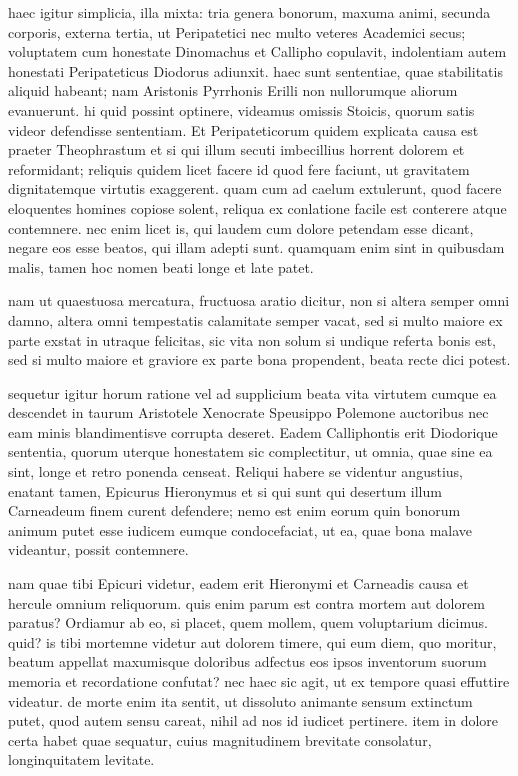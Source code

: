  haec igitur simplicia, illa mixta: tria genera bonorum, maxuma animi, secunda corporis, externa tertia, ut Peripatetici nec multo veteres Academici secus; voluptatem cum honestate Dinomachus et Callipho copulavit, indolentiam autem honestati Peripateticus Diodorus adiunxit. haec sunt sententiae, quae stabilitatis aliquid habeant; nam Aristonis Pyrrhonis Erilli non nullorumque aliorum evanuerunt. hi quid possint optinere, videamus omissis Stoicis, quorum satis videor defendisse sententiam. Et Peripateticorum quidem explicata causa est praeter Theophrastum et si qui illum secuti imbecillius horrent dolorem et reformidant; reliquis quidem licet facere id quod fere faciunt, ut gravitatem dignitatemque virtutis exaggerent. quam cum ad caelum extulerunt, quod facere eloquentes homines copiose solent, reliqua ex conlatione facile est conterere atque contemnere. nec enim licet is, qui laudem cum dolore petendam esse dicant, negare eos esse beatos, qui illam adepti sunt. quamquam enim sint in quibusdam malis, tamen hoc nomen beati longe et late patet.

 nam ut quaestuosa mercatura, fructuosa aratio dicitur, non si altera semper omni damno, altera omni tempestatis calamitate semper vacat, sed si multo maiore ex parte exstat in utraque felicitas, sic vita non solum si undique referta bonis est, sed si multo maiore et graviore ex parte bona propendent, beata recte dici potest.

 sequetur igitur horum ratione vel ad supplicium beata vita virtutem cumque ea descendet in taurum Aristotele Xenocrate Speusippo Polemone auctoribus nec eam minis blandimentisve corrupta deseret. Eadem Calliphontis erit Diodorique sententia, quorum uterque honestatem sic complectitur, ut omnia, quae sine ea sint, longe et retro ponenda censeat. Reliqui habere se videntur angustius, enatant tamen, Epicurus Hieronymus et si qui sunt qui desertum illum Carneadeum finem curent defendere; nemo est enim eorum quin bonorum animum putet esse iudicem eumque condocefaciat, ut ea, quae bona malave videantur, possit contemnere.

 nam quae tibi Epicuri videtur, eadem erit Hieronymi et Carneadis causa et hercule omnium reliquorum. quis enim parum est contra mortem aut dolorem paratus? Ordiamur ab eo, si placet, quem mollem, quem voluptarium dicimus. quid? is tibi mortemne videtur aut dolorem timere, qui eum diem, quo moritur, beatum appellat maxumisque doloribus adfectus eos ipsos inventorum suorum memoria et recordatione confutat? nec haec sic agit, ut ex tempore quasi effuttire videatur. de morte enim ita sentit, ut dissoluto animante sensum extinctum putet, quod autem sensu careat, nihil ad nos id iudicet pertinere. item in dolore certa habet quae sequatur, cuius magnitudinem brevitate consolatur, longinquitatem levitate.

